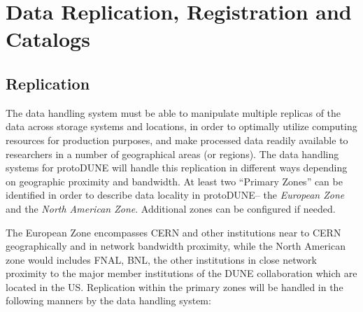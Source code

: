 \documentclass[12pt]{article}
\newcommand{\pd}{protoDUNE\xspace}
\begin{document}
\section{Data Replication, Registration and Catalogs}
\subsection{Replication}
\label{sec:replication}
The data handling system must be able to manipulate multiple replicas of the data across storage systems and locations, in order
to optimally utilize computing resources for production purposes, and make processed data readily available to researchers in
a number of geographical areas (or regions).
The data handling systems for \pd will handle this replication in different ways
depending on geographic proximity and bandwidth.  At least two ``Primary Zones'' can be identified in order
to describe data locality in \pd -- the \textit{European Zone} and the \textit{North American Zone}.
Additional zones can be configured if needed.

The European Zone encompasses CERN and other institutions near to CERN geographically and in network bandwidth proximity,
while the North American zone would includes  FNAL, BNL, the other institutions
in close network proximity to the major member institutions of the DUNE collaboration which are located in the US.
Replication within the primary zones will be handled in the following manners by the data handling system:
\end{document}
